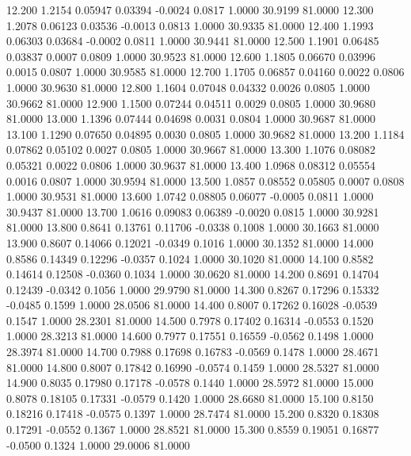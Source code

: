   12.200   1.2154   0.05947   0.03394  -0.0024   0.0817   1.0000  30.9199  81.0000
  12.300   1.2078   0.06123   0.03536  -0.0013   0.0813   1.0000  30.9335  81.0000
  12.400   1.1993   0.06303   0.03684  -0.0002   0.0811   1.0000  30.9441  81.0000
  12.500   1.1901   0.06485   0.03837   0.0007   0.0809   1.0000  30.9523  81.0000
  12.600   1.1805   0.06670   0.03996   0.0015   0.0807   1.0000  30.9585  81.0000
  12.700   1.1705   0.06857   0.04160   0.0022   0.0806   1.0000  30.9630  81.0000
  12.800   1.1604   0.07048   0.04332   0.0026   0.0805   1.0000  30.9662  81.0000
  12.900   1.1500   0.07244   0.04511   0.0029   0.0805   1.0000  30.9680  81.0000
  13.000   1.1396   0.07444   0.04698   0.0031   0.0804   1.0000  30.9687  81.0000
  13.100   1.1290   0.07650   0.04895   0.0030   0.0805   1.0000  30.9682  81.0000
  13.200   1.1184   0.07862   0.05102   0.0027   0.0805   1.0000  30.9667  81.0000
  13.300   1.1076   0.08082   0.05321   0.0022   0.0806   1.0000  30.9637  81.0000
  13.400   1.0968   0.08312   0.05554   0.0016   0.0807   1.0000  30.9594  81.0000
  13.500   1.0857   0.08552   0.05805   0.0007   0.0808   1.0000  30.9531  81.0000
  13.600   1.0742   0.08805   0.06077  -0.0005   0.0811   1.0000  30.9437  81.0000
  13.700   1.0616   0.09083   0.06389  -0.0020   0.0815   1.0000  30.9281  81.0000
  13.800   0.8641   0.13761   0.11706  -0.0338   0.1008   1.0000  30.1663  81.0000
  13.900   0.8607   0.14066   0.12021  -0.0349   0.1016   1.0000  30.1352  81.0000
  14.000   0.8586   0.14349   0.12296  -0.0357   0.1024   1.0000  30.1020  81.0000
  14.100   0.8582   0.14614   0.12508  -0.0360   0.1034   1.0000  30.0620  81.0000
  14.200   0.8691   0.14704   0.12439  -0.0342   0.1056   1.0000  29.9790  81.0000
  14.300   0.8267   0.17296   0.15332  -0.0485   0.1599   1.0000  28.0506  81.0000
  14.400   0.8007   0.17262   0.16028  -0.0539   0.1547   1.0000  28.2301  81.0000
  14.500   0.7978   0.17402   0.16314  -0.0553   0.1520   1.0000  28.3213  81.0000
  14.600   0.7977   0.17551   0.16559  -0.0562   0.1498   1.0000  28.3974  81.0000
  14.700   0.7988   0.17698   0.16783  -0.0569   0.1478   1.0000  28.4671  81.0000
  14.800   0.8007   0.17842   0.16990  -0.0574   0.1459   1.0000  28.5327  81.0000
  14.900   0.8035   0.17980   0.17178  -0.0578   0.1440   1.0000  28.5972  81.0000
  15.000   0.8078   0.18105   0.17331  -0.0579   0.1420   1.0000  28.6680  81.0000
  15.100   0.8150   0.18216   0.17418  -0.0575   0.1397   1.0000  28.7474  81.0000
  15.200   0.8320   0.18308   0.17291  -0.0552   0.1367   1.0000  28.8521  81.0000
  15.300   0.8559   0.19051   0.16877  -0.0500   0.1324   1.0000  29.0006  81.0000
